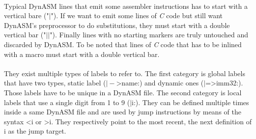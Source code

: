 \\
Typical DynASM lines that emit some assembler instructions has to start with a
vertical bare ("$\vert$"). If we want to emit some lines of \emph{C} code but
still want DynASM's preprocessor to do substitutions, they must start with a double vertical bar ("$\vert\vert$"). Finally lines with no starting markers are
truly untouched and discarded by DynASM. To be noted that lines of \emph{C} code that
has to be inlined with a macro must start with a double vertical bar. \\

\\
They exist multiple types of labels to refer to. The first category is global
labels that have two types, static label ($\vert-$\textgreater name:) and dynamic ones ($\vert$=\textgreater imm32:).
Those labels have to be unique in a DynASM file. The second category is local
labels that use a single digit from 1 to 9 ($\vert$i:). They can be defined
multiple times inside a same DynASM file and are used by jump instructions by
means of the syntax \textless i or \textgreater i. They respectively point to
the most recent, the next definition of i as the jump target.
